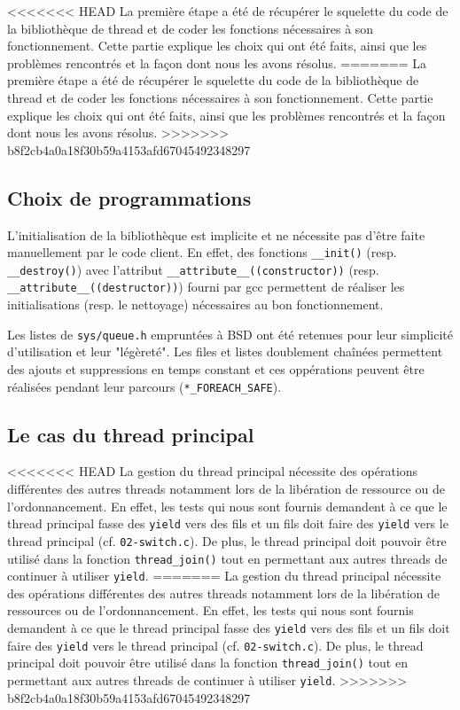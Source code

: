 <<<<<<< HEAD
La première étape a été de récupérer le squelette du code de la bibliothèque de
thread et de coder les fonctions nécessaires à son fonctionnement. Cette partie
explique les choix qui ont été faits, ainsi que les problèmes rencontrés et la
façon dont nous les avons résolus.
=======
La première étape a été de récupérer le squelette du code de la bibliothèque de thread et de coder les fonctions nécessaires à son fonctionnement. Cette partie explique les choix qui ont été faits, ainsi que les problèmes rencontrés et la façon dont nous les avons résolus.
>>>>>>> b8f2cb4a0a18f30b59a4153afd67045492348297

\subsection{Choix de programmations}

L'initialisation de la bibliothèque est implicite et ne nécessite pas d'être
faite manuellement par le code client. En effet, des fonctions \verb!__init()!
(resp. \verb!__destroy()!) avec l'attribut \verb!__attribute__((constructor))!
(resp. \verb!__attribute__((destructor))!) fourni par gcc permettent de
réaliser les initialisations (resp. le nettoyage) nécessaires au bon
fonctionnement.

Les listes de \verb!sys/queue.h! empruntées à BSD ont été retenues pour leur
simplicité d'utilisation et leur "légèreté". Les files et listes doublement
chaînées permettent des ajouts et suppressions en temps constant et ces
oppérations peuvent être réalisées pendant leur parcours
(\verb!*_FOREACH_SAFE!).


\subsection{Le cas du thread principal}

<<<<<<< HEAD
La gestion du thread principal nécessite des opérations différentes des autres
threads notamment lors de la libération de ressource ou de l'ordonnancement. En
effet, les tests qui nous sont fournis demandent à ce que le thread principal
fasse des \verb!yield! vers des fils et un fils doit faire des \verb!yield!
vers le thread principal (cf. \verb!02-switch.c!). De plus, le thread principal
doit pouvoir être utilisé dans la fonction \verb!thread_join()! tout en
permettant aux autres threads de continuer à utiliser \verb!yield!.
=======
La gestion du thread principal nécessite des opérations différentes des autres threads notamment lors de la libération de ressources ou de l'ordonnancement. En effet, les tests qui nous sont fournis demandent à ce que le thread principal fasse des \verb!yield! vers des fils et un fils doit faire des \verb!yield! vers le thread principal (cf. \verb!02-switch.c!). De plus, le thread principal doit pouvoir être utilisé dans la fonction \verb!thread_join()! tout en permettant aux autres threads de continuer à utiliser \verb!yield!.
>>>>>>> b8f2cb4a0a18f30b59a4153afd67045492348297

